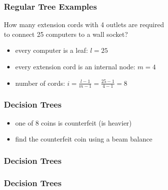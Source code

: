 \documentclass[dvipsnames]{beamer}
\begin{document}
\begin{frame}
  \frametitle{Regular Tree Examples}

  \begin{example}
    How many extension cords with 4 outlets are required\\
    to connect 25 computers to a wall socket?

    \pause
    \bigskip
    \begin{itemize}
      \item every computer is a leaf: $l = 25$
      \item every extension cord is an internal node: $m = 4$

      \pause
      \item number of cords: $i = \frac{l - 1}{m - 1} = \frac{25 - 1}{4 - 1} = 8$
    \end{itemize}
  \end{example}
\end{frame}

\begin{frame}
  \frametitle{Decision Trees}

  \begin{example}
    \begin{itemize}
      \item one of 8 coins is counterfeit (is heavier)
      \item find the counterfeit coin using a beam balance
    \end{itemize}
  \end{example}
\end{frame}

\begin{frame}
  \frametitle{Decision Trees}

  \begin{example}[in 3 weighings]
    \begin{center}
    \end{center}
  \end{example}
\end{frame}

\begin{frame}
  \frametitle{Decision Trees}

  \begin{example}[in 2 weighings]
    \begin{center}
    \end{center}
  \end{example}
\end{frame}
\end{document}
